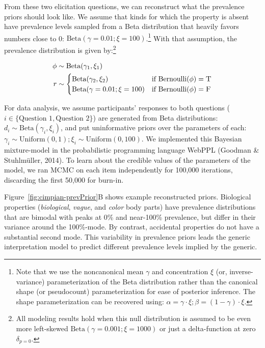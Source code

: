 \documentclass[,man,floatsintext]{apa6}
\let\rmarkdownfootnote\footnote%
\def\footnote{\protect\rmarkdownfootnote}
\theoremstyle{definition}
\theoremstyle{definition}
\theoremstyle{definition}
\theoremstyle{remark}
\begin{document}
From these two elicitation questions, we can reconstruct what the
prevalence priors should look like. We assume that kinds for which the
property is absent have prevalence levels sampled from a Beta
distribution that heavily favors numbers close to 0:
\(\text{Beta}(\gamma = 0.01; \xi = 100)\).\footnote{Note that we use the
  noncanonical mean \(\gamma\) and concentration \(\xi\) (or,
  inverse-variance) parameterization of the Beta distribution rather
  than the canonical shape (or pseudocount) parameterization for ease of
  posterior inference. The shape parameterization can be recovered
  using: \(\alpha = \gamma \cdot \xi; \beta = (1 - \gamma) \cdot \xi\).}
With that assumption, the prevalence distribution is given by:\footnote{All
  modeling results hold when this null distribution is assumed to be
  even more left-skewed \(\text{Beta}(\gamma = 0.001; \xi = 1000)\) or
  just a delta-function at zero \(\delta_{p=0}\).}

\begin{align}
\phi & \sim \text{Beta}(\gamma_1, \xi_1) \nonumber \\ 
r & \sim \begin{cases}
        \text{Beta}(\gamma_2, \xi_2) &\mbox{if } \text{Bernoulli}(\phi) = \textsc{T} \label{eq:priorModel}  \\
        \text{Beta}(\gamma = 0.01; \xi = 100) &\mbox{if } \text{Bernoulli}(\phi) = \textsc{F} \\
        \end{cases}
\end{align}

For data analysis, we assume participants' responses to both questions
(\(i \in \{\text{Question 1}, \text{Question 2}\}\)) are generated from
Beta distributions: \(d_{i} \sim \text{Beta}(\gamma_i, \xi_i)\), and put
uninformative priors over the parameters of each:
\(\gamma_i \sim \text{Uniform}(0, 1); \xi_i \sim \text{Uniform}(0, 100)\).
We implemented this Bayesian mixture-model in the probabilistic
programming language WebPPL (Goodman \& Stuhlmüller, 2014). To learn
about the credible values of the parameters of the model, we ran MCMC on
each item independently for 100,000 iterations, discarding the first
50,000 for burn-in.

Figure~\ref{fig:cimpian-prevPrior}B shows example reconstructed priors.
Biological properties (\emph{biological}, \emph{vague}, and \emph{color}
body parts) have prevalence distributions that are bimodal with peaks at
0\% and near-100\% prevalence, but differ in their variance around the
100\%-mode. By contrast, accidental properties do not have a substantial
second mode. This variability in prevalence priors leads the generic
interpretation model to predict different prevalence levels implied by
the generic.
\end{document}
